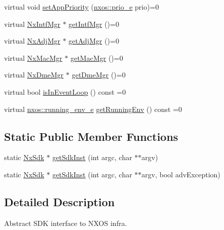 \begin{DoxyCompactItemize}
\item 
virtual void \mbox{\hyperlink{classnxos_1_1_nx_sdk_a46d9487216506aa19e5499759f5eaef7}{set\+App\+Priority}} (\mbox{\hyperlink{namespacenxos_af446a76676837368bde9b15343ae21d5}{nxos\+::prio\+\_\+e}} prio)=0
\item 
virtual \mbox{\hyperlink{classnxos_1_1_nx_intf_mgr}{Nx\+Intf\+Mgr}} $\ast$ \mbox{\hyperlink{classnxos_1_1_nx_sdk_ac860ca0ab2bd58d28f990685c63906a0}{get\+Intf\+Mgr}} ()=0
\item 
virtual \mbox{\hyperlink{classnxos_1_1_nx_adj_mgr}{Nx\+Adj\+Mgr}} $\ast$ \mbox{\hyperlink{classnxos_1_1_nx_sdk_af6e3db3e34b003693d765835ea0dbb49}{get\+Adj\+Mgr}} ()=0
\item 
virtual \mbox{\hyperlink{classnxos_1_1_nx_mac_mgr}{Nx\+Mac\+Mgr}} $\ast$ \mbox{\hyperlink{classnxos_1_1_nx_sdk_adfa969f547080efd92f90f55ebc930c5}{get\+Mac\+Mgr}} ()=0
\item 
virtual \mbox{\hyperlink{classnxos_1_1_nx_dme_mgr}{Nx\+Dme\+Mgr}} $\ast$ \mbox{\hyperlink{classnxos_1_1_nx_sdk_a089933980bfe0466870510bb94158763}{get\+Dme\+Mgr}} ()=0
\item 
virtual bool \mbox{\hyperlink{classnxos_1_1_nx_sdk_ae2a6d199227de068bda5a720a7f29e94}{is\+In\+Event\+Loop}} () const =0
\item 
virtual \mbox{\hyperlink{namespacenxos_a5d2faf90d8673c5bf207f3883d3ca506}{nxos\+::running\+\_\+env\+\_\+e}} \mbox{\hyperlink{classnxos_1_1_nx_sdk_a6ebf9ceb029ce71ecfead7d9183ae4e3}{get\+Running\+Env}} () const =0
\end{DoxyCompactItemize}
\subsection*{Static Public Member Functions}
\begin{DoxyCompactItemize}
\item 
static \mbox{\hyperlink{classnxos_1_1_nx_sdk}{Nx\+Sdk}} $\ast$ \mbox{\hyperlink{classnxos_1_1_nx_sdk_a5050e2d26c40744b4fc7862068a83f39}{get\+Sdk\+Inst}} (int argc, char $\ast$$\ast$argv)
\item 
static \mbox{\hyperlink{classnxos_1_1_nx_sdk}{Nx\+Sdk}} $\ast$ \mbox{\hyperlink{classnxos_1_1_nx_sdk_acdeb12edbd291b5421ddb3260547bf8a}{get\+Sdk\+Inst}} (int argc, char $\ast$$\ast$argv, bool adv\+Exception)
\end{DoxyCompactItemize}


\subsection{Detailed Description}
Abstract S\+DK interface to N\+X\+OS infra. 

